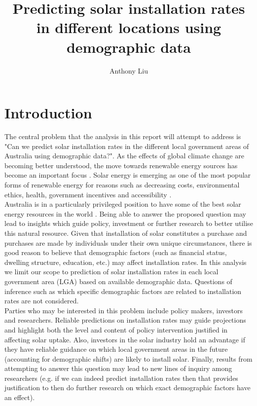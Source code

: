 \documentclass[a4paper]{article}
\begin{document}
\author{Anthony Liu}
\title{Predicting solar installation rates in different locations using demographic data}
\maketitle

\tableofcontents

\section{Introduction}

The central problem that the analysis in this report will attempt to address is "Can we predict solar installation rates in the different local government areas of Australia using demographic data?". As the effects of global climate change are becoming better understood, the move towards renewable energy sources has become an important focus \cite{ipcc}. Solar energy is emerging as one of the most popular forms of renewable energy for reasons such as decreasing costs, environmental ethics, health, government incentives and accessibility \cite{pew, seia}. \\

Australia is in a particularly privileged position to have some of the best solar energy resources in the world \cite{geogov}. Being able to answer the proposed question may lead to insights which guide policy, investment or further research to better utilise this natural resource. Given that installation of solar constitutes a purchase and purchases are made by individuals under their own unique circumstances, there is good reason to believe that demographic factors (such as financial status, dwelling structure, education, etc.) may affect installation rates. In this analysis we limit our scope to prediction of solar installation rates in each local government area (LGA) based on available demographic data. Questions of inference such as which specific demographic factors are related to installation rates are not considered. \\

Parties who may be interested in this problem include policy makers, investors and researchers. Reliable predictions on installation rates may guide projections and highlight both the level and content of policy intervention justified in affecting solar uptake. Also, investors in the solar industry hold an advantage if they have reliable guidance on which local government areas in the future (accounting for demographic shifts) are likely to install solar. Finally, results from attempting to answer this question may lead to new lines of inquiry among researchers (e.g. if we can indeed predict installation rates then that provides justification to then do further research on which exact demographic factors have an effect).
\end{document}
